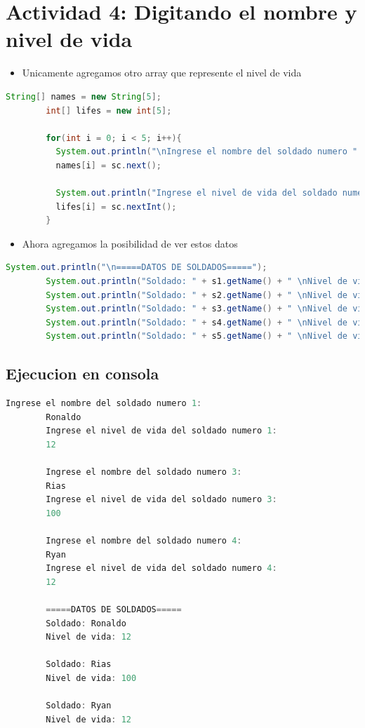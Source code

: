 \documentclass{article}
\begin{document}
        \section{Actividad 4: Digitando el nombre y nivel de vida}
        \begin{itemize}
            \item Unicamente agregamos otro array que represente el nivel de vida
        \end{itemize}
        \begin{lstlisting}[language=java, caption={Pidiendo al usuario la vida de los soldados}]
        String[] names = new String[5];
        int[] lifes = new int[5];
    
        for(int i = 0; i < 5; i++){
          System.out.println("\nIngrese el nombre del soldado numero " + (i + 1) + ":");
          names[i] = sc.next();
    
          System.out.println("Ingrese el nivel de vida del soldado numero " + (i + 1) + ":");
          lifes[i] = sc.nextInt();
        }        
        \end{lstlisting}
        \begin{itemize}
            \item Ahora agregamos la posibilidad de ver estos datos
        \end{itemize}
        \begin{lstlisting}[language=java, caption={Codigo para salida de datos}]
        System.out.println("\n=====DATOS DE SOLDADOS=====");
        System.out.println("Soldado: " + s1.getName() + " \nNivel de vida: " + s1.getLife() + "\n");
        System.out.println("Soldado: " + s2.getName() + " \nNivel de vida: " + s2.getLife() + "\n");
        System.out.println("Soldado: " + s3.getName() + " \nNivel de vida: " + s3.getLife() + "\n");
        System.out.println("Soldado: " + s4.getName() + " \nNivel de vida: " + s4.getLife() + "\n");
        System.out.println("Soldado: " + s5.getName() + " \nNivel de vida: " + s5.getLife() + "\n");
        \end{lstlisting}
        \subsection{Ejecucion en consola}
        \begin{lstlisting}[language=java, caption={Porcion de ejecicion de VideoJuego.java}]
        Ingrese el nombre del soldado numero 1:
        Ronaldo
        Ingrese el nivel de vida del soldado numero 1:
        12
        
        Ingrese el nombre del soldado numero 3:
        Rias
        Ingrese el nivel de vida del soldado numero 3:
        100
        
        Ingrese el nombre del soldado numero 4:
        Ryan
        Ingrese el nivel de vida del soldado numero 4:
        12
        
        =====DATOS DE SOLDADOS=====
        Soldado: Ronaldo
        Nivel de vida: 12
        
        Soldado: Rias
        Nivel de vida: 100
        
        Soldado: Ryan
        Nivel de vida: 12
        \end{lstlisting}
\end{document}
